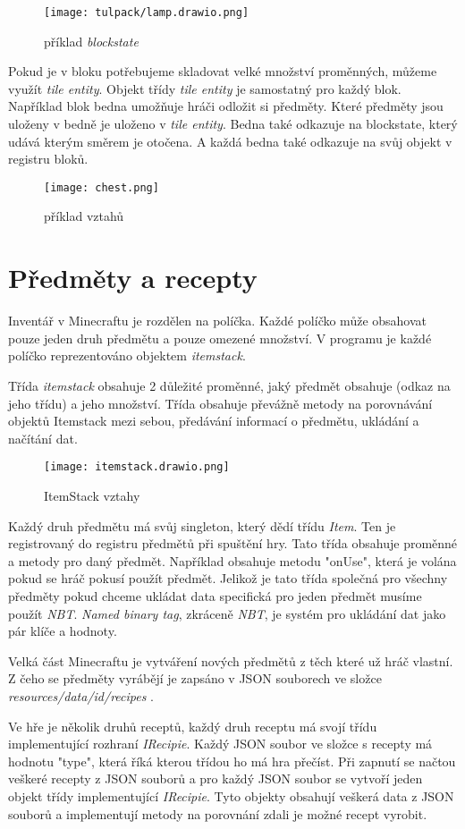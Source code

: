 \documentclass[FM,RP]{tulthesis}
\begin{document}
\begin{figure}[h]
    \centering
    \texttt{[image: tulpack/lamp.drawio.png]}
    \caption{příklad \textit{blockstate}}
    \label{fig:blockstate}
\end{figure}

\par Pokud je v bloku potřebujeme skladovat velké množství proměnných, můžeme využít \textit{tile entity}. Objekt třídy \textit{tile entity} je samostatný pro každý blok.
Například blok bedna umožňuje hráči odložit si předměty. Které předměty jsou uloženy v bedně je uloženo v \textit{tile entity}. Bedna také odkazuje na blockstate, který udává kterým směrem je otočena. A každá bedna také odkazuje na svůj objekt v registru bloků. 
\begin{figure}[h]
    \centering
    \texttt{[image: chest.png]}
    \caption{příklad vztahů}
    \label{fig:enter-label}
\end{figure}

\section{Předměty a recepty}
Inventář v Minecraftu je rozdělen na políčka. Každé políčko může obsahovat pouze jeden druh předmětu a pouze omezené množství. V programu je každé políčko reprezentováno objektem \textit{itemstack}. 
\par Třída \textit{itemstack}  obsahuje 2 důležité proměnné, jaký předmět obsahuje (odkaz na jeho třídu) a jeho množství. Třída obsahuje převážně metody na porovnávání objektů Itemstack mezi sebou, předávání informací o předmětu, ukládání a načítání dat.
\begin{figure}[h]
    \centering
    \texttt{[image: itemstack.drawio.png]}
    \caption{ItemStack vztahy}
    \label{fig:enter-label}
\end{figure}
\par Každý druh předmětu má svůj singleton, který dědí třídu \textit{Item}. Ten je registrovaný do registru předmětů při spuštění hry. Tato třída obsahuje proměnné a metody pro daný předmět. Například obsahuje metodu "onUse", která je volána pokud se hráč pokusí použít předmět. Jelikož je tato třída společná pro všechny předměty pokud chceme ukládat data specifická pro jeden předmět musíme použít \textit{NBT}. \textit{Named binary tag}, zkráceně \textit{NBT},  je systém pro ukládání dat jako pár klíče a hodnoty.
\par Velká část Minecraftu je vytváření nových předmětů z těch které už hráč vlastní. Z čeho se předměty vyrábějí je zapsáno v JSON souborech ve složce \textit{resources/data/id/recipes} .
\par Ve hře je několik druhů receptů, každý druh receptu má svojí třídu implementující rozhraní \textit{IRecipie}. Každý JSON soubor ve složce s recepty má hodnotu "type", která říká kterou třídou ho má hra přečíst. Při zapnutí se načtou veškeré recepty z JSON souborů a pro každý JSON soubor se vytvoří jeden objekt třídy implementující \textit{IRecipie}. Tyto objekty obsahují veškerá data z JSON souborů a implementují metody na porovnání zdali je možné recept vyrobit.    
\end{document}
